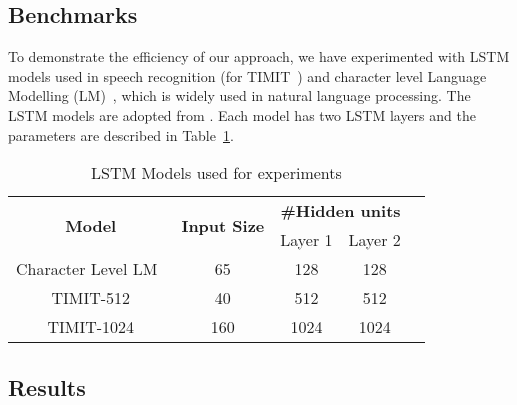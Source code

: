{\subsection{Benchmarks}
To demonstrate the efficiency of our approach, we have experimented with LSTM models used in speech recognition (for TIMIT~\cite{garofolo1993timit}) and character level Language Modelling (LM)~\cite{sundermeyer2015feedforward}, which is widely used in natural language processing. The LSTM models are adopted from \cite{azari2020elsa,park2018maximizing,han2017ese}. Each model has two LSTM layers and the parameters are described in Table~\ref{tab:lstmModels}.
\begin{table}[]
	\centering
	\caption{LSTM Models used for experiments}
	\begin{tabular}{@{}ccccll@{}}
		\toprule
		\multirow{2}{*}{\textbf{Model}} & \multirow{2}{*}{\textbf{Input Size}} & \multicolumn{2}{c}{\textbf{\#Hidden units}} & \multicolumn{2}{l}{\multirow{5}{*}{}} \\ \cmidrule(lr){3-4}
		&                                      & Layer 1              & Layer 2              & \multicolumn{2}{l}{}                  \\ \cmidrule(r){1-4}
		Character Level LM~\cite{azari2020elsa}                              & 65                                   & 128                  & 128                  & \multicolumn{2}{l}{}                  \\ \cmidrule(r){1-4}
		TIMIT-512 \cite{park2018maximizing}                      & 40                                   & 512                  & 512                  & \multicolumn{2}{l}{}                  \\ \cmidrule(r){1-4}
		TIMIT-1024 \cite{han2017ese}                     & 160                                  & 1024                 & 1024                 & \multicolumn{2}{l}{}                  \\ \bottomrule
	\end{tabular}
	\label{tab:lstmModels}
\end{table}
\subsection{Results}
}
